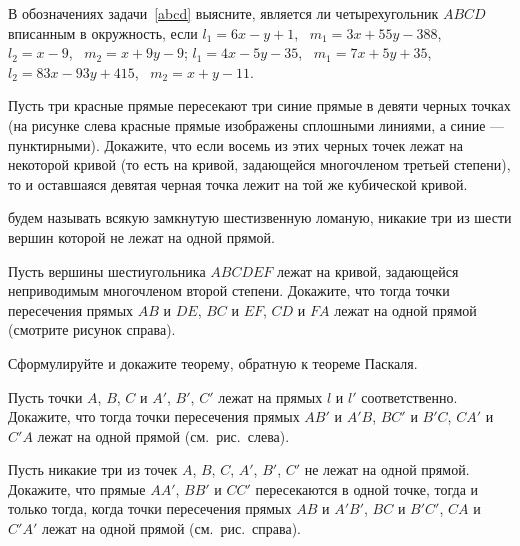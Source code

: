 \documentclass[a4paper,11pt]{article}
\begin{document}
 В обозначениях задачи~\ref{abcd} выясните, является ли четырехугольник
$ABCD$ вписанным в окружность, если
 $l_1=6x-y+1$, \ $m_1=3x+55y-388$, \ $l_2=x-9$, \ $m_2=x+9y-9$;
 $l_1=4x-5y-35$, \ $m_1=7x+5y+35$, \ $l_2=83x-93y+415$, \ $m_2=x+y-11$.


{
  Пусть три красные прямые пересекают
три синие прямые в девяти черных
точках
(на рисунке слева красные прямые изображены сплошными
линиями, а синие --- пунктирными).
Докажите, что если восемь из этих черных точек
лежат на некоторой  кривой
(то есть на кривой, задающейся многочленом третьей степени),
то и оставшаяся девятая черная точка  лежит на той же кубической кривой.
}

\vspace*{-2.3cm}
\vspace*{17mm}

  \/ будем называть всякую замкнутую шестизвенную
ломаную, никакие три из шести вершин которой не лежат на одной прямой.

{
 Пусть вершины шестиугольника
$ABCDEF$
лежат на кривой, задающейся неприводимым многочленом второй степени.
Докажите, что тогда
точки пересечения прямых $AB$ и $DE$, $BC$ и $EF$, $CD$ и $FA$
лежат на одной прямой
(смотрите рисунок справа).
}

\vspace*{-1.5cm}
\vspace*{10mm}

  Сформулируйте и докажите теорему, обратную к теореме Паскаля.

\medskip
\medskip

{
 Пусть точки $A$, $B$, $C$ и $A'$, $B'$, $C'$
лежат на прямых $l$ и $l'$ соответственно.
Докажите, что тогда точки пересечения прямых
$AB'$ и $A'B$, $BC'$ и $B'C$, $CA'$ и $C'A$ лежат на одной прямой
(см.~рис.~слева).
}

\vspace*{-1.5cm}
\vspace*{15mm}


{
 Пусть никакие три из точек $A$, $B$, $C$,
$A'$, $B'$, $C'$ не лежат на одной прямой.
Докажите, что прямые $AA'$, $BB'$
и $CC'$ пересекаются в одной точке,
тогда и только тогда, когда точки пересечения прямых $AB$ и $A'B'$,
$BC$ и $B'C'$, $CA$ и $C'A'$ лежат на одной прямой (см.~рис.~справа).
}
\end{document}
